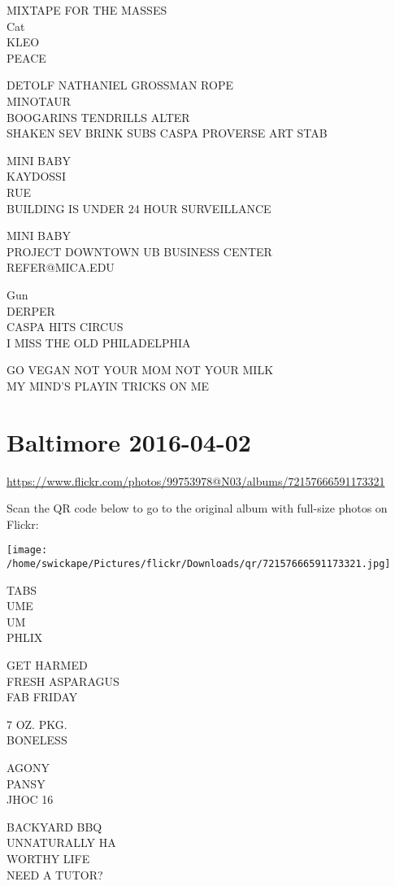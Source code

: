 \documentclass[10pt,letterpaper]{article}
\begin{document}
MIXTAPE FOR THE MASSES\\
Cat\\
KLEO\\
PEACE

DETOLF NATHANIEL GROSSMAN ROPE\\
MINOTAUR\\
BOOGARINS TENDRILLS ALTER\\
SHAKEN SEV BRINK SUBS CASPA PROVERSE ART STAB

MINI BABY\\
KAYDOSSI\\
RUE\\
BUILDING IS UNDER 24 HOUR SURVEILLANCE

MINI BABY\\
PROJECT DOWNTOWN UB BUSINESS CENTER\\
REFER@MICA.EDU

Gun\\
DERPER\\
CASPA HITS CIRCUS\\
I MISS THE OLD PHILADELPHIA

GO VEGAN NOT YOUR MOM NOT YOUR MILK\\
MY MIND'S PLAYIN TRICKS ON ME
\pagebreak

\section*{Baltimore 2016-04-02}

\url{https://www.flickr.com/photos/99753978@N03/albums/72157666591173321}

Scan the QR code below to go to the original album with full-size photos on Flickr:

\texttt{[image: /home/swickape/Pictures/flickr/Downloads/qr/72157666591173321.jpg]}
\pagebreak

TABS\\
UME\\
UM\\
PHLIX

GET HARMED\\
FRESH ASPARAGUS\\
FAB FRIDAY

7 OZ. PKG.\\
BONELESS

AGONY\\
PANSY\\
JHOC 16

BACKYARD BBQ\\
UNNATURALLY HA\\
WORTHY LIFE\\
NEED A TUTOR?
\end{document}
